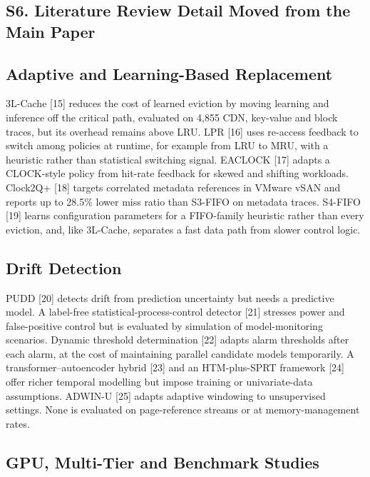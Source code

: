 \documentclass[journal,onecolumn]{IEEEtran}
\begin{document}
\subsection*{S6. Literature Review Detail Moved from the Main Paper}
\subsection{Adaptive and Learning-Based Replacement}

3L-Cache [15] reduces the cost of learned eviction by moving learning and
inference off the critical path, evaluated on 4,855 CDN, key-value and block
traces, but its overhead remains above LRU. LPR [16] uses re-access feedback to
switch among policies at runtime, for example from LRU to MRU, with a
heuristic rather than statistical switching signal. EACLOCK [17] adapts a
CLOCK-style policy from hit-rate feedback for skewed and shifting workloads.
Clock2Q+ [18] targets correlated metadata references in VMware vSAN and reports
up to 28.5\% lower miss ratio than S3-FIFO on metadata traces. S4-FIFO [19]
learns configuration parameters for a FIFO-family heuristic rather than every
eviction, and, like 3L-Cache, separates a fast data path from slower control
logic.

\subsection{Drift Detection}

PUDD [20] detects drift from prediction uncertainty but needs a predictive
model. A label-free statistical-process-control detector [21] stresses power
and false-positive control but is evaluated by simulation of model-monitoring
scenarios. Dynamic threshold determination [22] adapts alarm thresholds after
each alarm, at the cost of maintaining parallel candidate models temporarily.
A transformer--autoencoder hybrid [23] and an HTM-plus-SPRT framework [24]
offer richer temporal modelling but impose training or univariate-data
assumptions. ADWIN-U [25] adapts adaptive windowing to unsupervised settings.
None is evaluated on page-reference streams or at memory-management rates.

\subsection{GPU, Multi-Tier and Benchmark Studies}
\end{document}
